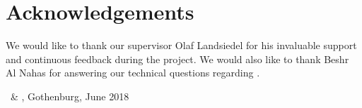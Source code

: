 \thispagestyle{plain}			%
\section*{Acknowledgements}
We would like to thank our supervisor Olaf Landsiedel for his invaluable support and continuous feedback during the project. We would also like to thank Beshr Al Nahas for answering our technical questions regarding \atwo{}.



\vspace{1.5cm}
\hfill
\firstauthor\ \& \secondauthor, Gothenburg, June 2018

\newpage				%
\thispagestyle{empty}
\mbox{}